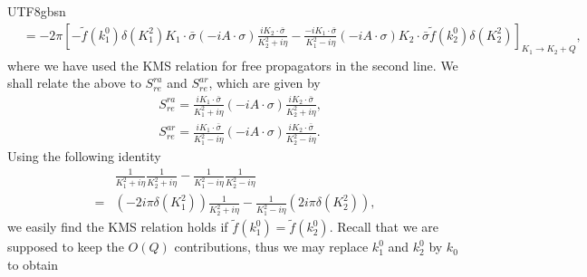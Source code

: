 \documentclass[11pt]{article}\def\baselinestretch{1.4}
\def\d{{\delta}}
\def\h{\eta}
\def\p{{\pi}}
\def\s{{\sigma}}
\def\({\left(}
\def\){\right)}
\begin{document}
\begin{CJK}{UTF8}{gbsn}
\begin{align}
&=-2\p\left[-\tilde{f}(k_1^0)\d(K_1^2)K_1\cdot\bar{\s}(-iA\cdot \sigma )\frac{iK_2\cdot \bar{\sigma }}{K_2^2+i \eta }-\frac{-iK_1\cdot \bar{\sigma }}{K_1^2-i \eta }(-iA\cdot \sigma )K_2\cdot\bar{\s}\tilde{f}(k_2^0)\d(K_2^2)\right]_{K_1\to K_2+Q},
\end{align}
where we have used the KMS relation for free propagators in the second line.
We shall relate the above to $S_{re}^{ra}$ and $S_{re}^{ar}$, which are given by
\begin{align}
&S_{re}^{ra}=\frac{iK_1\cdot\bar{\s}}{K_1^2+i\h}(-iA\cdot\s)\frac{iK_2\cdot\bar{\s}}{K_2^2+i\h},\nonumber\\
&S_{re}^{ar}=\frac{iK_1\cdot\bar{\s}}{K_1^2-i\h}(-iA\cdot\s)\frac{iK_2\cdot\bar{\s}}{K_2^2-i\h}.
\end{align}
Using the following identity
\begin{align}
&\frac{1}{K_1^2+i\h}\frac{1}{K_2^2+i\h}-\frac{1}{K_1^2-i\h}\frac{1}{K_2^2-i\h}\nonumber\\
=&\(-2i\p\d(K_1^2)\)\frac{1}{K_2^2+i\h}-\frac{1}{K_1^2-i\h}\(2i\p\d(K_2^2)\),
\end{align}
we easily find the KMS relation holds if $\tilde{f}(k_1^0)=\tilde{f}(k_2^0)$. Recall that we are supposed to keep the $O(Q)$ contributions, thus we may replace $k_1^0$ and $k_2^0$ by $k_0$ to obtain

\end{CJK}
\end{document}
